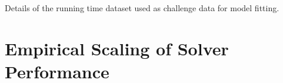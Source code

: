\begin{table}
\noindent \begin{centering}

\par\end{centering}

\caption{\label{tab:Details-dataset-challenge} Details of the running time dataset used as challenge data for model fitting.}
\end{table}

%
%
%
%

\section{Empirical Scaling of Solver Performance}

\label{sec:Results}

